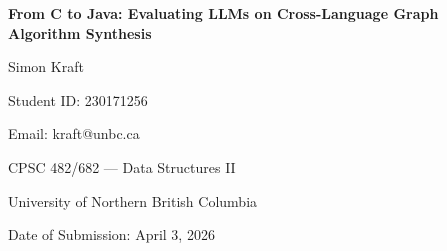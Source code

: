 

\singlespacing



\begin{titlepage}
    \centering
    \vspace*{2cm}
    {\Huge\bfseries From C to Java: Evaluating LLMs on Cross-Language Graph Algorithm Synthesis\par}
    \vspace{2cm}
    {\Large Simon Kraft\par}
    \vspace{0.5cm}
    {\large Student ID: 230171256\par}
    {\large Email: kraft@unbc.ca\par}
    \vspace{0.5cm}
    {\large CPSC 482/682 --- Data Structures II\par}
    {\large University of Northern British Columbia\par}
    \vspace{0.5cm}
    {\large Date of Submission: April 3, 2026\par}
\end{titlepage}

